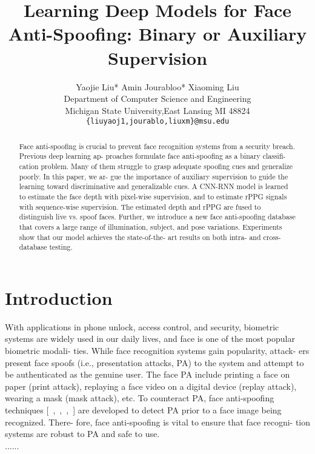 \documentclass[10pt,twocolumn,letterpaper]{article}
\begin{document}
\title{Learning Deep Models for Face Anti-Spoofing: Binary or Auxiliary Supervision }

\author{Yaojie Liu* \quad Amin Jourabloo* \quad Xiaoming Liu\\
Department of Computer Science and Engineering\\
Michigan State University,East Lansing MI 48824\\
{\tt\small \{liuyaoj1,jourablo,liuxm\}@msu.edu}
}



\maketitle

\begin{abstract}
   Face anti-spoofing is crucial to prevent face recognition
systems from a security breach. Previous deep learning ap-
proaches formulate face anti-spoofing as a binary classifi-
cation problem. Many of them struggle to grasp adequate
spoofing cues and generalize poorly. In this paper, we ar-
gue the importance of auxiliary supervision to guide the
learning toward discriminative and generalizable cues. A
CNN-RNN model is learned to estimate the face depth with
pixel-wise supervision, and to estimate rPPG signals with
sequence-wise supervision. The estimated depth and rPPG
are fused to distinguish live vs. spoof faces. Further, we
introduce a new face anti-spoofing database that covers a
large range of illumination, subject, and pose variations.
Experiments show that our model achieves the state-of-the-
art results on both intra- and cross-database testing.
\end{abstract}

\section{Introduction}
With applications in phone unlock, access control, and
security, biometric systems are widely used in our daily
lives, and face is one of the most popular biometric modali-
ties. While face recognition systems gain popularity, attack-
ers present face spoofs (i.e., presentation attacks, PA) to the
system and attempt to be authenticated as the genuine user.
The face PA include printing a face on paper (print attack),
replaying a face video on a digital device (replay attack),
wearing a mask (mask attack), etc. To counteract PA, face
anti-spoofing techniques [~\cite{chetty2006multi},~\cite{frischholz2000biold},~\cite{frischholz2003avoiding},~\cite{li2004live}] 
are developed to
detect PA prior to a face image being recognized. There-
fore, face anti-spoofing is vital to ensure that face recogni-
tion systems are robust to PA and safe to use.\\
......
\end{document}
